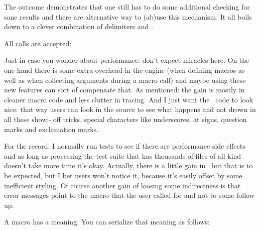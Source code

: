 \startbuffer[definition]
\tolerant{}
\stopbuffer

\typebuffer[definition][option=TEX] \getbuffer[definition]

\startbuffer[example]
\dontleavehmode \foo[a=1]
\dontleavehmode \foo[b=]
\dontleavehmode \foo[=]
\dontleavehmode \foo[x]\ignorearguments
\stopbuffer

The outcome demonstrates that one still has to do some additional checking for sane
results and there are alternative way to (ab)use this mechanism. It all boils down
to a clever combination of delimiters and \type {\ignorearguments}.

\typebuffer[example][option=TEX]

All calls are accepted:

\startlines \getbuffer[example] \stoplines

Just in case you wonder about performance: don't expect miracles here. On the one
hand there is some extra overhead in the engine (when defining macros as well as
when collecting arguments during a macro call) and maybe using these new features
can sort of compensate that. As mentioned: the gain is mostly in cleaner macro
code and less clutter in tracing. And I just want the \CONTEXT\ code to look
nice: that way users can look in the source to see what happens and not drown in
all these show|-|off tricks, special characters like underscores, at signs,
question marks and exclamation marks.

For the record: I normally run tests to see if there are performance side effects
and as long as processing the test suite that has thousands of files of all kind
doesn't take more time it's okay. Actually, there is a little gain in \CONTEXT\
but that is to be expected, but I bet users won't notice it, because it's easily
offset by some inefficient styling. Of course another gain of loosing some
indirectness is that error messages point to the macro that the user called for
and not to some follow up.

\stopsection

\startsection[title=Introspection]

A macro has a meaning. You can serialize that meaning as follows:

\startbuffer[definition]
\tolerant\protected{}

\meaning\foo
\stopbuffer

\typebuffer[definition][option=TEX]

